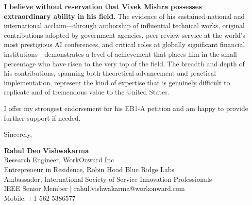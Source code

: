 \documentclass[11pt]{article}
\begin{document}
\textbf{I believe without reservation that Vivek Mishra possesses extraordinary ability in his field.} The evidence of his sustained national and international acclaim---through authorship of influential technical works, original contributions adopted by government agencies, peer review service at the world's most prestigious AI conferences, and critical roles at globally significant financial institutions---demonstrates a level of achievement that places him in the small percentage who have risen to the very top of the field. The breadth and depth of his contributions, spanning both theoretical advancement and practical implementation, represent the kind of expertise that is genuinely difficult to replicate and of tremendous value to the United States.

I offer my strongest endorsement for his EB1-A petition and am happy to provide further support if needed.

\vspace{12pt}

\noindent
Sincerely,

\vspace{24pt}

\noindent
\textbf{Rahul Deo Vishwakarma}\\
Research Engineer, WorkOnward Inc\\
Entrepreneur in Residence, Robin Hood Blue Ridge Labs\\
Ambassador, International Society of Service Innovation Professionals\\
IEEE Senior Member | rahul.vishwakarma@workonward.com\\
Mobile: +1 562 5386577
\end{document}
